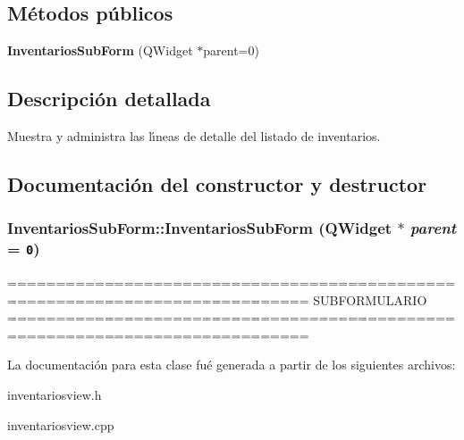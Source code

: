 \subsection*{M\'{e}todos p\'{u}blicos}
\begin{CompactItemize}
\item 
{\bf Inventarios\-Sub\-Form} (QWidget $\ast$parent=0)
\end{CompactItemize}


\subsection{Descripci\'{o}n detallada}
Muestra y administra las l\'{\i}neas de detalle del listado de inventarios. 



\subsection{Documentaci\'{o}n del constructor y destructor}
\subsubsection{\setlength{\rightskip}{0pt plus 5cm}Inventarios\-Sub\-Form::Inventarios\-Sub\-Form (QWidget $\ast$ {\em parent} = {\tt 0})}\label{classInventariosSubForm_a0}


============================================================================= SUBFORMULARIO ============================================================================= 

La documentaci\'{o}n para esta clase fu\'{e} generada a partir de los siguientes archivos:\begin{CompactItemize}
\item 
inventariosview.h\item 
inventariosview.cpp\end{CompactItemize}
